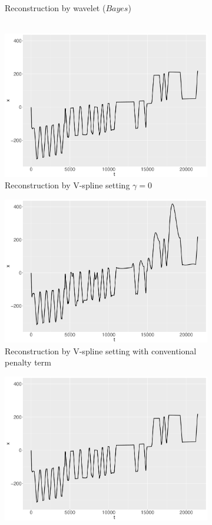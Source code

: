 \begin{figure}
\begin{subfigure}{0.45\textwidth}
    \caption{Reconstruction by wavelet ($\textit{Bayes}$)\\\mbox{  }}\label{ggRealdataXBayes}
    \end{subfigure}
    \begin{subfigure}{0.45\textwidth}
    \centering
    \includegraphics[width=\textwidth,height=0.5\textwidth]{Chapters/02TractorSplineTheory/plot/ggplot/ggRealdataXTractorGamma.pdf}
    \caption{Reconstruction by V-spline setting  $\gamma=0$ }\label{ggRealdataXTractorGamma}
    \end{subfigure}
    \begin{subfigure}{0.45\textwidth}
    \centering
    \includegraphics[width=\textwidth,height=0.5\textwidth]{Chapters/02TractorSplineTheory/plot/ggplot/ggRealdataXTractorAPT.pdf}
    \caption{Reconstruction by V-spline setting with conventional penalty term}\label{ggRealdataXTractorAPT}
    \end{subfigure}
    \begin{subfigure}{0.45\textwidth}
    \centering
    \includegraphics[width=\textwidth,height=0.5\textwidth]{Chapters/02TractorSplineTheory/plot/ggplot/ggRealdataXTractor.pdf}

\end{subfigure}
\end{figure}
